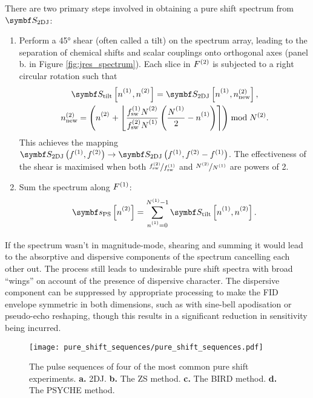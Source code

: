 There are two primary steps involved in obtaining a
pure shift spectrum from $\jresspec$:
\begin{enumerate}
    \item Perform a \ang{45} shear (often called a tilt) on the spectrum array,
        leading to the separation of chemical shifts and scalar couplings onto
        orthogonal axes  (panel b. in Figure \ref{fig:jres_spectrum}). Each
        slice in $F^{(2)}$ is subjected to a right circular rotation such that
        \begin{subequations}
            \begin{gather}
                \jresspectilt\left[{\none}\vpsub{\mathrm{sw}},{\ntwo}\vpsub{\mathrm{sw}}\right] =
                \jresspec\left[{\none}\vpsub{\mathrm{sw}},\ntwonew\right],\\
                \ntwonew = \left(
                    {\ntwo}\vpsub{\mathrm{new}} + \left\lfloor
                        \frac
                            {\fswone \Ntwo\vpsub{\mathrm{sw}}}
                            {\fswtwo \None\vpsub{\mathrm{sw}}}
                        \left(
                            \frac{\None\vpsub{\mathrm{sw}}}{2} - \none
                        \right)
                    \right\rceil
                \right) \bmod \Ntwo.
            \end{gather}
        \end{subequations}
        This achieves the mapping $\jresspec\left(\fone,\ftwo\right)
        \rightarrow \jresspec\left(\fone, \ftwo - \fone\right)$.
        The effectiveness of the shear is maximised when both
        $\nicefrac{f_{\mathrm{sw}}^{(2)}}{f_{\mathrm{sw}}^{(1)}}$ and $\nicefrac{N^{(2)}}{N^{(1)}}$ are powers
        of 2.
    \item Sum the spectrum along $F^{(1)}$:
        \begin{equation}
            \specps\idxntwo =
            \sum_{\none=0}^{\None-1} \jresspectilt\idxnonentwo.
        \end{equation}
\end{enumerate}%
If the spectrum wasn't in magnitude-mode, shearing and summing it would lead to the absorptive and dispersive
components of the spectrum cancelling each other out.
The process still leads to undesirable pure shift spectra with broad ``wings'' on
account of the presence of dispersive character. The dispersive component can
be suppressed by appropriate processing to make the FID envelope symmetric in
both dimensions, such as with sine-bell
apodisation or pseudo-echo
reshaping\cite{Bax1981}, though this results in a significant reduction in
sensitivity being incurred.
\begin{figure}
    \centering
    \texttt{[image: pure\_shift\_sequences/pure\_shift\_sequences.pdf]}
    \caption[
        The pulse sequences of some common pure shift experiments.
    ]{
        The pulse sequences of four of the most common pure shift experiments.
        \textbf{a.} \acs{2DJ}.
        \textbf{b.} The \acs{ZS} method.
        \textbf{c.} The \acs{BIRD} method.
        \textbf{d.} The \acs{PSYCHE} method.
    }
    \label{fig:pure_shift_seqs}
\end{figure}

